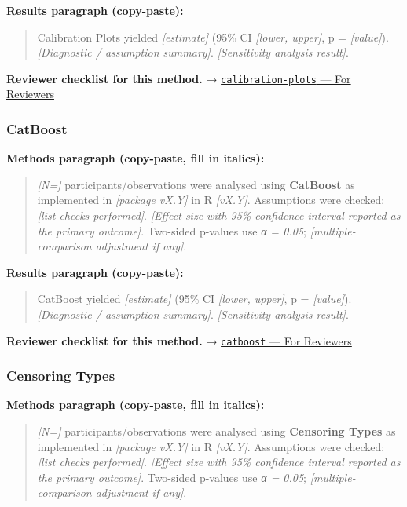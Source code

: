 \documentclass[
]{article}
\begin{document}
\textbf{Results paragraph (copy-paste):}

\begin{quote}
Calibration Plots yielded \emph{{[}estimate{]}} (95\% CI \emph{{[}lower,
upper{]}}, p = \emph{{[}value{]}}). \emph{{[}Diagnostic / assumption
summary{]}}. \emph{{[}Sensitivity analysis result{]}}.
\end{quote}

\textbf{Reviewer checklist for this method.} →
\href{../chapters/13-ml/calibration-plots.Rmd\#for-reviewers}{\texttt{calibration-plots}
--- For Reviewers}

\subsubsection{CatBoost}\label{catboost}

\textbf{Methods paragraph (copy-paste, fill in italics):}

\begin{quote}
\emph{{[}N={]}} participants/observations were analysed using
\textbf{CatBoost} as implemented in \emph{{[}package vX.Y{]}} in R
\emph{{[}vX.Y{]}}. Assumptions were checked: \emph{{[}list checks
performed{]}}. \emph{{[}Effect size with 95\% confidence interval
reported as the primary outcome{]}}. Two-sided p-values use \emph{α =
0.05}; \emph{{[}multiple-comparison adjustment if any{]}}.
\end{quote}

\textbf{Results paragraph (copy-paste):}

\begin{quote}
CatBoost yielded \emph{{[}estimate{]}} (95\% CI \emph{{[}lower,
upper{]}}, p = \emph{{[}value{]}}). \emph{{[}Diagnostic / assumption
summary{]}}. \emph{{[}Sensitivity analysis result{]}}.
\end{quote}

\textbf{Reviewer checklist for this method.} →
\href{../chapters/13-ml/catboost.Rmd\#for-reviewers}{\texttt{catboost}
--- For Reviewers}

\subsubsection{Censoring Types}\label{censoring-types}

\textbf{Methods paragraph (copy-paste, fill in italics):}

\begin{quote}
\emph{{[}N={]}} participants/observations were analysed using
\textbf{Censoring Types} as implemented in \emph{{[}package vX.Y{]}} in
R \emph{{[}vX.Y{]}}. Assumptions were checked: \emph{{[}list checks
performed{]}}. \emph{{[}Effect size with 95\% confidence interval
reported as the primary outcome{]}}. Two-sided p-values use \emph{α =
0.05}; \emph{{[}multiple-comparison adjustment if any{]}}.
\end{quote}
\end{document}
